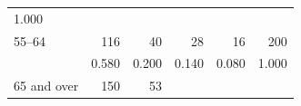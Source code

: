 \documentclass[11pt,a4paper,openany]{book}
\begin{document}
\begin{longtable}[]{@{}lrrrrr@{}}
\begin{minipage}[t]{0.04\columnwidth}
1.000\strut
\end{minipage}\tabularnewline
\begin{minipage}[t]{0.30\columnwidth}\raggedright\strut
55--64\strut
\end{minipage} & \begin{minipage}[t]{0.30\columnwidth}\raggedleft\strut
116\strut
\end{minipage} & \begin{minipage}[t]{0.06\columnwidth}\raggedleft\strut
40\strut
\end{minipage} & \begin{minipage}[t]{0.06\columnwidth}\raggedleft\strut
28\strut
\end{minipage} & \begin{minipage}[t]{0.06\columnwidth}\raggedleft\strut
16\strut
\end{minipage} & \begin{minipage}[t]{0.04\columnwidth}\raggedleft\strut
200\strut
\end{minipage}\tabularnewline
\begin{minipage}[t]{0.30\columnwidth}\raggedright\strut
\strut
\end{minipage} & \begin{minipage}[t]{0.30\columnwidth}\raggedleft\strut
0.580\strut
\end{minipage} & \begin{minipage}[t]{0.06\columnwidth}\raggedleft\strut
0.200\strut
\end{minipage} & \begin{minipage}[t]{0.06\columnwidth}\raggedleft\strut
0.140\strut
\end{minipage} & \begin{minipage}[t]{0.06\columnwidth}\raggedleft\strut
0.080\strut
\end{minipage} & \begin{minipage}[t]{0.04\columnwidth}\raggedleft\strut
1.000\strut
\end{minipage}\tabularnewline
\begin{minipage}[t]{0.30\columnwidth}\raggedright\strut
65 and over\strut
\end{minipage} & \begin{minipage}[t]{0.30\columnwidth}\raggedleft\strut
150\strut
\end{minipage} & \begin{minipage}[t]{0.06\columnwidth}\raggedleft\strut
53\strut
\end{minipage} & \begin{minipage}[t]{0.06\columnwidth}\raggedleft\strut

\end{minipage}
\end{longtable}
\end{document}
